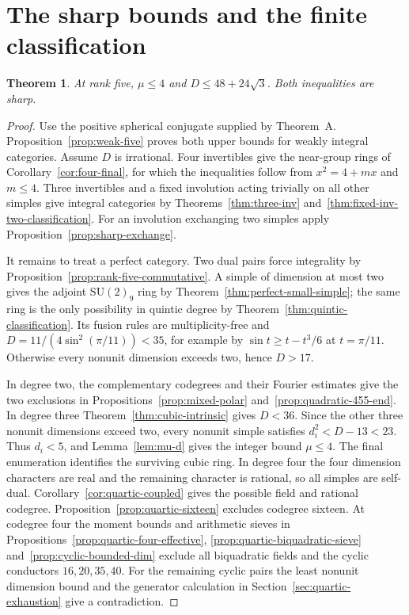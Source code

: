 \documentclass[11pt,a4paper]{article}
\newtheorem{theorem}{Theorem}[section]
\numberwithin{equation}{section}
\begin{document}
\section{The sharp bounds and the finite classification}\label{sec:remaining}
\begin{theorem}\label{thm:sharp-final}
At rank five, $\mu\le4$ and $D\le48+24\sqrt3$. Both inequalities are sharp.
\end{theorem}
\begin{proof}
Use the positive spherical conjugate supplied by Theorem~A. Proposition~\ref{prop:weak-five} proves both upper bounds for weakly integral categories. Assume $D$ is irrational. Four invertibles give the near-group rings of Corollary~\ref{cor:four-final}, for which the inequalities follow from $x^2=4+mx$ and $m\le4$. Three invertibles and a fixed involution acting trivially on all other simples give integral categories by Theorems~\ref{thm:three-inv} and~\ref{thm:fixed-inv-two-classification}. For an involution exchanging two simples apply Proposition~\ref{prop:sharp-exchange}.

It remains to treat a perfect category. Two dual pairs force integrality by Proposition~\ref{prop:rank-five-commutative}. A simple of dimension at most two gives the adjoint $\mathrm{SU}(2)_9$ ring by Theorem~\ref{thm:perfect-small-simple}; the same ring is the only possibility in quintic degree by Theorem~\ref{thm:quintic-classification}. Its fusion rules are multiplicity-free and $D=11/(4\sin^2(\pi/11))<35$, for example by $\sin t\ge t-t^3/6$ at $t=\pi/11$. Otherwise every nonunit dimension exceeds two, hence $D>17$.

In degree two, the complementary codegrees and their Fourier estimates give the two exclusions in Propositions~\ref{prop:mixed-polar} and~\ref{prop:quadratic-455-end}. In degree three Theorem~\ref{thm:cubic-intrinsic} gives $D<36$.
Since the other three nonunit dimensions exceed two, every nonunit simple
satisfies $d_i^2<D-13<23$. Thus $d_i<5$, and
Lemma~\ref{lem:mu-d} gives the integer bound $\mu\le4$.
The final enumeration identifies the surviving cubic ring. In degree four the four dimension characters are real and the remaining character is rational, so all simples are self-dual. Corollary~\ref{cor:quartic-coupled} gives the possible field and rational codegree. Proposition~\ref{prop:quartic-sixteen} excludes codegree sixteen. At codegree four the moment bounds and arithmetic sieves in Propositions~\ref{prop:quartic-four-effective}, \ref{prop:quartic-biquadratic-sieve} and~\ref{prop:cyclic-bounded-dim} exclude all biquadratic fields and the cyclic conductors $16,20,35,40$. For the remaining cyclic pairs the least nonunit dimension bound and the generator calculation in Section~\ref{sec:quartic-exhaustion} give a contradiction.


\end{proof}
\end{document}
